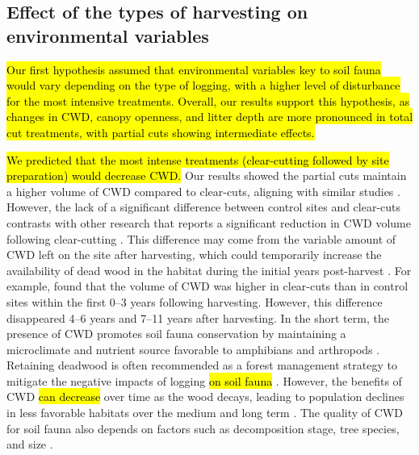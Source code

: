 \subsection*{Effect of the types of harvesting on environmental variables}
\label{disc:env_var}

\hl{Our first hypothesis assumed that environmental variables key to soil fauna would vary depending on the type of logging, with a higher level of disturbance for the most intensive treatments. 
Overall, our results support this hypothesis, as changes in CWD, canopy openness, and litter depth are more pronounced in total cut treatments, with partial cuts showing intermediate effects.} 

\hl{We predicted that the most intense treatments (clear-cutting followed by site preparation) would decrease CWD. }
Our results showed the partial cuts maintain a higher volume of CWD compared to clear-cuts, aligning with similar studies \citep{Nolet2018Comparingeffects,Ochs2022Responseterrestrial}. 
However, the lack of a significant difference between control sites and clear-cuts contrasts with other research that reports a significant reduction in CWD volume following clear-cutting \citep{Farnell2020effectsvariable}. 
This difference may come from the variable amount of CWD left on the site after harvesting, which could temporarily increase the availability of dead wood in the habitat during the initial years post-harvest \citep{McCarthy1994Distributionabundance,Etcheverry2005Responsesmall}. 
For example, \cite{Ochs2022Responseterrestrial} found that the volume of CWD was higher in clear-cuts than in control sites within the first 0–3 years following harvesting. 
However, this difference disappeared 4–6 years and 7–11 years after harvesting. 
In the short term, the presence of CWD promotes soil fauna conservation by maintaining a microclimate and nutrient source favorable to amphibians and arthropods \citep{spotilaRoleTemperatureWater1972,Huhta1976Effectsclearcutting,Seibold2021contributioninsects,Ochs2022Responseterrestrial}. 
Retaining deadwood is often recommended as a forest management strategy to mitigate the negative impacts of logging \hl{on soil fauna} \citep{McKenny2006Effectsstructural,Raymond-Leonard2020Deadwood}. 
However, the benefits of CWD \hl{can decrease} over time as the wood decays, leading to population declines in less favorable habitats over the medium and long term \citep{Ochs2022Responseterrestrial}. 
The quality of CWD for soil fauna also depends on factors such as decomposition stage, tree species, and size \citep{Bunnell2010woodbiodiversity}. 
